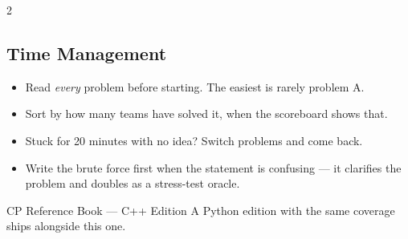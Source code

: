 \documentclass[10pt]{article}
\begin{document}
\begin{multicols}{2}
\subsection{Time Management}
\begin{itemize}
    \item Read \emph{every} problem before starting. The easiest is
          rarely problem A.
    \item Sort by how many teams have solved it, when the scoreboard
          shows that.
    \item Stuck for 20 minutes with no idea? Switch problems and come
          back.
    \item Write the brute force first when the statement is confusing ---
          it clarifies the problem and doubles as a stress-test oracle.
\end{itemize}

\end{multicols}

\vfill
\begin{center}
{\footnotesize\color{cmt}
CP Reference Book --- C++ Edition \quad\textbullet\quad
A Python edition with the same coverage ships alongside this one.\par}
\end{center}
\end{document}

